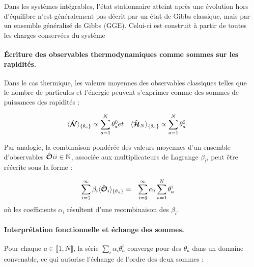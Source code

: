 Dans les systèmes intégrables, l’état stationnaire atteint après une évolution hors d’équilibre n’est généralement pas décrit par un état de Gibbs classique, mais par un ensemble généralisé de Gibbs (GGE). Celui-ci est construit à partir de toutes les charges conservées du système

\paragraph{Écriture des observables thermodynamiques comme sommes sur les rapidités.}

Dans le cas thermique, les valeurs moyennes des observables classiques telles que le nombre de particules et l'énergie peuvent s'exprimer comme des sommes de puissances des rapidités :

\begin{eqnarray*}
	\langle \hat{\bm{\mathcal{N}}} \rangle_{\{ \theta_a\} } \propto \sum_{a = 1}^N \theta_a^0  & et & \langle \hat{\bm{\mathcal{H}}}_N \rangle_{\{ \theta_a\} } \propto \sum_{a = 1}^N \theta_a^2 .	
\end{eqnarray*}

Par analogie, la combinaison pondérée des valeurs moyennes d’un ensemble d’observables ${ \hat{\bm{\mathcal{O}}}i }{i \in \mathbb{N}}$, associée aux multiplicateurs de Lagrange ${ \beta_i }$, peut être réécrite sous la forme :

\begin{eqnarray}
	\sum_{i = 1}^\infty  \beta_i \langle \hat{\bm{\mathcal{O}}}_i \rangle_{ \{\theta_a \} } & = & \sum_{i = 0}^\infty \alpha_i \sum_{a = 1 }^N \theta_a^i		
\end{eqnarray}
où les coefficients $\alpha_i$ résultent d’une recombinaison des $\beta_i$.

\paragraph{Interprétation fonctionnelle et échange des sommes.}
	
Pour chaque $a \in \llbracket 1, N \rrbracket$, la série $\sum_i \alpha_i \theta_a^i$ converge pour des $\theta_a$ dans un domaine convenable, ce qui autorise l’échange de l’ordre des deux sommes : 
	
